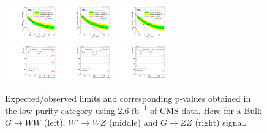 \begin{figure}[h!]
\centering
\includegraphics[width=0.20\textwidth]{figures/analysis/search1/AN-15-211/limits/brazilianFlag_BulkWW_VVLP_new_combined_purity_13TeV_wPDF.pdf}
\includegraphics[width=0.20\textwidth]{figures/analysis/search1/AN-15-211/limits/brazilianFlag_WZ_VVLP_new_combined_purity_13TeV_wPDF.pdf}
\includegraphics[width=0.20\textwidth]{figures/analysis/search1/AN-15-211/limits/brazilianFlag_BulkZZ_VVLP_new_combined_purity_13TeV_wPDF.pdf}\\
\includegraphics[width=0.20\textwidth]{figures/analysis/search1/AN-15-211/pvalues/pvalue_BulkWWinVVnew_low_purity.pdf}
\includegraphics[width=0.20\textwidth]{figures/analysis/search1/AN-15-211/pvalues/pvalue_WZinVVnew_low_purity.pdf}
\includegraphics[width=0.20\textwidth]{figures/analysis/search1/AN-15-211/pvalues/pvalue_BulkZZinVVnew_low_purity.pdf}
\caption{Expected/observed limits and corresponding p-values obtained in the low purity category using 2.6 $\textrm{fb}^{-1}$ of CMS data. Here for a Bulk $G\rightarrow WW$ (left), $W'\rightarrow WZ$ (middle) and $G\rightarrow ZZ$ (right) signal.}
\label{fig:searchI:Limits_LP}
\end{figure}

